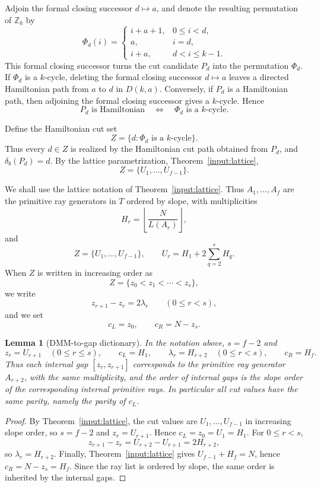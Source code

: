 \documentclass[11pt]{article}
\newtheorem{lemma}[theorem]{Lemma}
\newcommand{\Z}{\mathbb Z}
\begin{document}
Adjoin the formal closing successor $d\mapsto a$, and denote the resulting permutation of $\Z_k$ by
\[
\Phi_d(i)=
\begin{cases}
        i+a+1, & 0\le i<d,\\
        a, & i=d,\\
        i+a, & d<i\le k-1.
\end{cases}
\]
This formal closing successor turns the cut candidate $P_d$ into the permutation $\Phi_d$.  If $\Phi_d$ is a $k$-cycle, deleting the formal closing successor $d\mapsto a$ leaves a directed Hamiltonian path from $a$ to $d$ in $D(k,a)$.  Conversely, if $P_d$ is a Hamiltonian path, then adjoining the formal closing successor gives a $k$-cycle.  Hence
\[
        P_d\text{ is Hamiltonian}
        \quad\Longleftrightarrow\quad
        \Phi_d\text{ is a }k\text{-cycle}.
\]

Define the Hamiltonian cut set
\[
        Z=\{d:\Phi_d\text{ is a }k\text{-cycle}\}.
\]
Thus every $d\in Z$ is realized by the Hamiltonian cut path obtained from $P_d$, and $\delta_b(P_d)=d$.  By the lattice parametrization, Theorem~\ref{input:lattice},
\[
        Z=\{U_1,\ldots,U_{f-1}\}.
\]

We shall use the lattice notation of Theorem~\ref{input:lattice}.  Thus $A_1,\ldots,A_f$ are the primitive ray generators in $T$ ordered by slope, with multiplicities
\[
        H_r=\left\lfloor\frac{N}{L(A_r)}\right\rfloor,
\]
and
\[
        Z=\{U_1,\ldots,U_{f-1}\},
        \qquad
        U_r=H_1+2\sum_{q=2}^{r}H_q.
\]
When $Z$ is written in increasing order as
\[
        Z=\{z_0<z_1<\cdots<z_s\},
\]
we write
\[
        z_{r+1}-z_r=2\lambda_r
        \qquad(0\le r<s),
\]
and we set
\[
        c_L=z_0,
        \qquad
        c_R=N-z_s.
\]

\begin{lemma}[DMM-to-gap dictionary]\label{lem:gap-dictionary}
In the notation above, $s=f-2$ and
\[
        z_r=U_{r+1}\quad(0\le r\le s),
        \qquad
        c_L=H_1,
        \qquad
        \lambda_r=H_{r+2}\quad(0\le r<s),
        \qquad
        c_R=H_f.
\]
Thus each internal gap $[z_r,z_{r+1}]$ corresponds to the primitive ray generator $A_{r+2}$, with the same multiplicity, and the order of internal gaps is the slope order of the corresponding internal primitive rays.  In particular all cut values have the same parity, namely the parity of $c_L$.
\end{lemma}

\begin{proof}
By Theorem~\ref{input:lattice}, the cut values are $U_1,\ldots,U_{f-1}$ in increasing slope order, so $s=f-2$ and $z_r=U_{r+1}$.  Hence $c_L=z_0=U_1=H_1$.  For $0\le r<s$,
\[
        z_{r+1}-z_r
        =U_{r+2}-U_{r+1}
        =2H_{r+2},
\]
so $\lambda_r=H_{r+2}$.  Finally, Theorem~\ref{input:lattice} gives $U_{f-1}+H_f=N$, hence $c_R=N-z_s=H_f$.  Since the ray list is ordered by slope, the same order is inherited by the internal gaps.
\end{proof}
\end{document}
